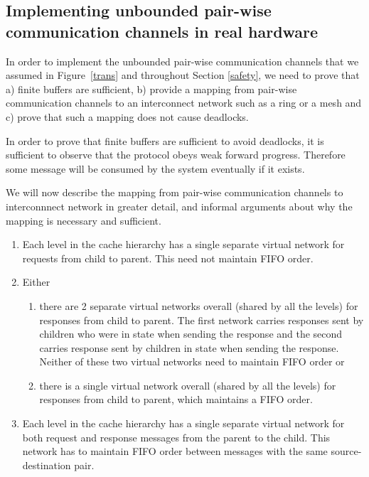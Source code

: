 
\subsection{Implementing unbounded pair-wise communication channels in real hardware}


In order to implement the unbounded pair-wise communication channels that we
assumed in Figure~\ref{trans} and throughout Section \ref{safety}, we need
to prove that a) finite buffers are sufficient, b) provide a mapping from
pair-wise communication channels to an interconnect network such as a ring or a
mesh and c) prove that such a mapping does not cause deadlocks.

In order to prove that finite buffers are sufficient to avoid deadlocks, it is
sufficient to observe that the protocol obeys weak forward progress. Therefore
some message will be consumed by the system eventually if it exists.

We will now describe the mapping from pair-wise communication channels
to interconnnect network in greater detail, and informal arguments
about why the mapping is necessary and sufficient.

\begin{enumerate}
\item Each level in the cache hierarchy has a single separate virtual network
for requests from child to parent. This need not maintain FIFO order.
\item Either
\begin{enumerate}
\item there are 2 separate virtual networks overall (shared by all the levels)
for responses from child to parent. The first network carries responses sent by
children who were in state \Mo{} when sending the response and the second
carries response sent by children in state \Sh{} when sending the response.
Neither of these two virtual networks need to maintain FIFO order or
\item there is a single virtual network overall (shared by all the levels) for
responses from child to parent, which maintains a FIFO order.
\end{enumerate}
\item Each level in the cache hierarchy has a single separate virtual network
for both request and response messages from the parent to the child. This
network has to maintain FIFO order between messages with the same
source-destination pair.
\end{enumerate}

